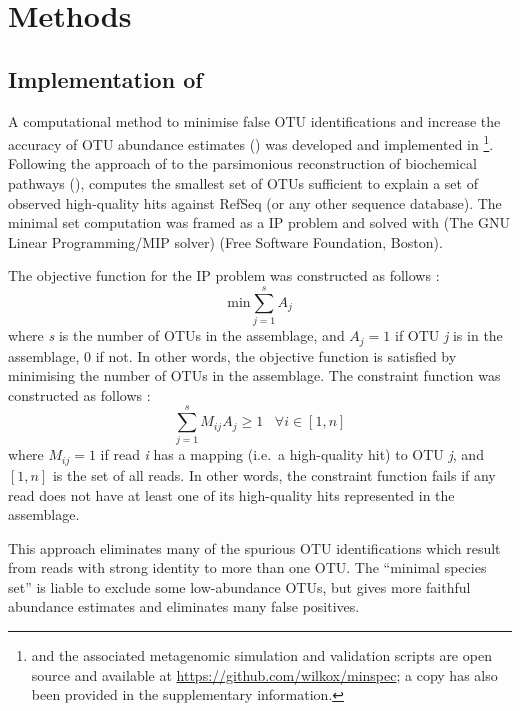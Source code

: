 \section{Methods}

\subsection{Implementation of }

A computational method to minimise false \ac{OTU} identifications and increase the accuracy of \ac{OTU} abundance estimates () was developed and implemented in \footnote{ and the associated metagenomic simulation and validation scripts are open source and available at \url{https://github.com/wilkox/minspec}; a copy has also been provided in the supplementary information.}.
Following the approach of \citet{Ye:2009bl} to the parsimonious reconstruction of biochemical pathways (),  computes the smallest set of \acp{OTU} sufficient to explain a set of observed high-quality hits against RefSeq (or any other sequence database).
The minimal set computation was framed as a \ac{IP} problem and solved with  (The GNU Linear Programming/MIP solver) (Free Software Foundation, Boston).

The objective function for the \ac{IP} problem was constructed as follows \citep[adapted from][]{Ye:2009bl}:
\begin{equation*}
\mathrm{min}\sum_{j=1}^{s}A_{j}
\end{equation*}
where \textit{s} is the number of \acp{OTU} in the assemblage, and $A_{j} = 1$ if \ac{OTU} \textit{j} is in the assemblage, 0 if not.
In other words, the objective function is satisfied by minimising the number of \acp{OTU} in the assemblage.
The constraint function was constructed as follows \citep[adapted from][]{Ye:2009bl}:
\begin{equation*}
\sum_{j=1}^{s}M_{ij}A_{j}\ge1 \; \; \; \forall i \in [1,n]
\end{equation*}
where $M_{ij} = 1$ if read \textit{i} has a mapping (i.e.\ a high-quality  hit) to \ac{OTU} \textit{j}, and $[1,n]$ is the set of all reads.
In other words, the constraint function fails if any read does not have at least one of its high-quality  hits represented in the assemblage.

This approach eliminates many of the spurious \ac{OTU} identifications which result from reads with strong identity to more than one \ac{OTU}.
The ``minimal species set'' is liable to exclude some low-abundance \acp{OTU}, but gives more faithful abundance estimates and eliminates many false positives.

